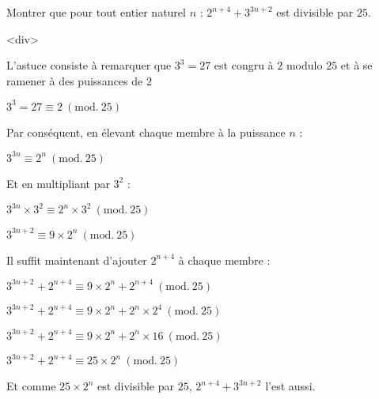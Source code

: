 
%
Montrer que pour tout entier naturel $n$ : $2^{n +4}+3^{3n+2} $ est divisible par $25$.
\begin{corrige}
     <div>
     \begin{note}L'astuce consiste à remarquer que $3^3=27$ est congru à $2$ modulo $25$ et à se ramener à des puissances de  $2$\end{note}
     $3^3 = 27  \equiv 2 \ (\text{mod.}\ 25)$
     \par
     Par conséquent, en élevant chaque membre à la puissance $n$ :
     \par
     $3^{3n}  \equiv 2^n \ (\text{mod.}\ 25)$
     \par
     Et en multipliant par $3^2$ :
     \par
     $3^{3n} \times 3^2  \equiv 2^n \times 3^2 \ (\text{mod.}\ 25)$
     \par
     $3^{3n+2}  \equiv 9 \times 2^n\ (\text{mod.}\ 25)$
     \par
     Il suffit maintenant d'ajouter $2^{n +4}$ à chaque membre :
     \par
     $3^{3n+2} + 2^{n +4} \equiv 9 \times 2^n + 2^{n +4} \ (\text{mod.}\ 25)$
     \par
     $3^{3n+2} + 2^{n +4} \equiv 9 \times 2^n + 2^{n} \times 2^4 \ (\text{mod.}\ 25)$
     \par
     $3^{3n+2} + 2^{n +4} \equiv 9 \times 2^n + 2^{n} \times 16 \ (\text{mod.}\ 25)$
     \par
     $3^{3n+2} + 2^{n +4} \equiv 25 \times 2^n \ (\text{mod.}\ 25)$
     \par
     Et comme $25 \times 2^n$ est divisible par $25$, $2^{n +4}+3^{3n+2} $ l'est aussi.

\end{corrige}
